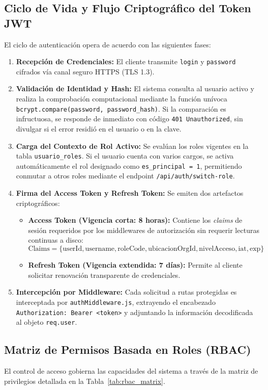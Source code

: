 \documentclass[a4paper,12pt]{article}
\begin{document}
\subsection{Ciclo de Vida y Flujo Criptográfico del Token JWT}
El ciclo de autenticación opera de acuerdo con las siguientes fases:
\begin{enumerate}[leftmargin=1.5em]
    \item \textbf{Recepción de Credenciales:} El cliente transmite \texttt{login} y \texttt{password} cifrados vía canal seguro HTTPS (TLS 1.3).
    \item \textbf{Validación de Identidad y Hash:} El sistema consulta al usuario activo y realiza la comprobación computacional mediante la función unívoca \texttt{bcrypt.compare(password, password\_hash)}. Si la comparación es infructuosa, se responde de inmediato con código \texttt{401 Unauthorized}, sin divulgar si el error residió en el usuario o en la clave.
    \item \textbf{Carga del Contexto de Rol Activo:} Se evalúan los roles vigentes en la tabla \texttt{usuario\_roles}. Si el usuario cuenta con varios cargos, se activa automáticamente el rol designado como \texttt{es\_principal = 1}, permitiendo conmutar a otros roles mediante el endpoint \texttt{/api/auth/switch-role}.
    \item \textbf{Firma del Access Token y Refresh Token:} Se emiten dos artefactos criptográficos:
    \begin{itemize}
        \item \textbf{Access Token (Vigencia corta: 8 horas):} Contiene los \emph{claims} de sesión requeridos por los middlewares de autorización sin requerir lecturas continuas a disco:
        \[
        \text{Claims} = \{ \text{userId}, \text{username}, \text{roleCode}, \text{ubicacionOrgId}, \text{nivelAcceso}, \text{iat}, \text{exp} \}
        \]
        \item \textbf{Refresh Token (Vigencia extendida: 7 días):} Permite al cliente solicitar renovación transparente de credenciales.
    \end{itemize}
    \item \textbf{Intercepción por Middleware:} Cada solicitud a rutas protegidas es interceptada por \texttt{authMiddleware.js}, extrayendo el encabezado \texttt{Authorization: Bearer <token>} y adjuntando la información decodificada al objeto \texttt{req.user}.
\end{enumerate}

\subsection{Matriz de Permisos Basada en Roles (RBAC)}
El control de acceso gobierna las capacidades del sistema a través de la matriz de privilegios detallada en la Tabla~\ref{tab:rbac_matrix}.
\end{document}
